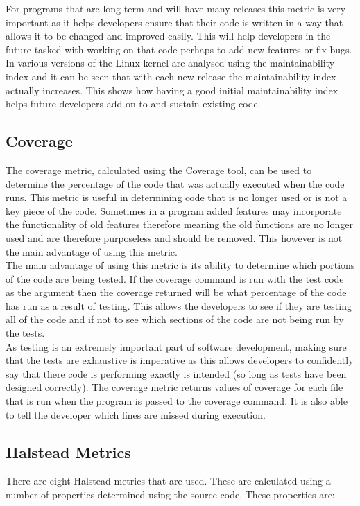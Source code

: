 \documentclass[10.5pt,journal, a4paper]{IEEEtran}
\begin{document}
\noindent
For programs that are long term and will have many releases this metric is very important as it helps developers ensure that their code is written in a way that allows it to be changed and improved easily. This will help developers in the future tasked with working on that code perhaps to add new features or fix bugs. In \cite{Linux} various versions of the Linux kernel are analysed using the maintainability index and it can be seen that with each new release the maintainability index actually increases. This shows how having a good initial maintainability index helps future developers add on to and sustain existing code.


\subsection{Coverage}
\noindent 
The coverage metric, calculated using the Coverage tool, can be used to determine the percentage of the code that was actually executed when the code runs. This metric is useful in determining code that is no longer used or is not a key piece of the code. Sometimes in a program added features may incorporate the functionality of old features therefore meaning the old functions are no longer used and are therefore purposeless and should be removed. This however is not the main advantage of using this metric.\\

\noindent
The main advantage of using this metric is its ability to determine which portions of the code are being tested. If the coverage command is run with the test code as the argument then the coverage returned will be what percentage of the code has run as a result of testing. This allows the developers to see if they are testing all of the code and if not to see which sections of the code are not being run by the tests. \\

\noindent
As testing is an extremely important part of software development, making sure that the tests are exhaustive is imperative as this allows developers to confidently say that there code is performing exactly is intended (so long as tests have been designed correctly). The coverage metric returns values of coverage for each file that is run when the program is passed to the coverage command. It is also able to tell the developer which lines are missed during execution. 



\subsection{Halstead Metrics}
\noindent
There are eight Halstead metrics that are used. These are calculated using a number of properties determined using the source code. These properties are:
\end{document}
